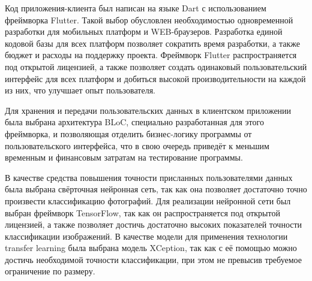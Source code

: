 \nwln
Код приложения-клиента был написан на языке Dart с использованием фреймворка Flutter\cite{flutter-vs-react}.
Такой выбор обусловлен необходимостью одновременной разработки для мобильных платформ и WEB-браузеров.
Разработка единой кодовой базы для всех платформ позволяет сократить время разработки, а также бюджет и расходы на поддержку проекта.
Фреймворк Flutter распространяется под открытой лицензией, а также позволяет создать одинаковый пользовательский интерфейс для всех платформ и добиться высокой производительности на каждой из них, что улучшает опыт пользователя\cite{flutter-better}.

\nwln
Для хранения и передачи пользовательских данных в клиентском приложении была выбрана архитектура BLoC\cite{bloc-better}, специально разработанная для этого фреймворка, и позволяющая отделить бизнес-логику программы от пользовательского интерфейса, что в свою очередь приведёт к меньшим временным и финансовым затратам на тестирование программы.

\nwln
В качестве средства повышения точности присланных пользователями данных была выбрана свёрточная нейронная сеть\cite{convolutional-better}, так как она позволяет достаточно точно произвести классификацию фотографий.
Для реализации нейронной сети был выбран фреймворк TensorFlow\cite{tensorflow-better}, так как он распространяется под открытой лицензией, а также позволяет достичь достаточно высоких показателей точности классификации изображений.
В качестве модели для применения технологии transfer learning была выбрана модель XCeption\cite{xception-better}, так как с её помощью можно достичь необходимой точности классификации, при этом не превысив требуемое ограничение по размеру.